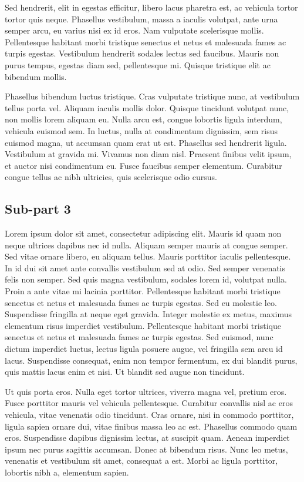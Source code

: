 \documentclass[a4paper,15pt]{article}
\begin{document}
Sed hendrerit, elit in egestas efficitur, libero lacus pharetra est, ac vehicula tortor tortor quis neque. Phasellus vestibulum, massa a iaculis volutpat, ante urna semper arcu, eu varius nisi ex id eros. Nam vulputate scelerisque mollis. Pellentesque habitant morbi tristique senectus et netus et malesuada fames ac turpis egestas. Vestibulum hendrerit sodales lectus sed faucibus. Mauris non purus tempus, egestas diam sed, pellentesque mi. Quisque tristique elit ac bibendum mollis.

Phasellus bibendum luctus tristique. Cras vulputate tristique nunc, at vestibulum tellus porta vel. Aliquam iaculis mollis dolor. Quisque tincidunt volutpat nunc, non mollis lorem aliquam eu. Nulla arcu est, congue lobortis ligula interdum, vehicula euismod sem. In luctus, nulla at condimentum dignissim, sem risus euismod magna, ut accumsan quam erat ut est. Phasellus sed hendrerit ligula. Vestibulum at gravida mi. Vivamus non diam nisl. Praesent finibus velit ipsum, et auctor nisi condimentum eu. Fusce faucibus semper elementum. Curabitur congue tellus ac nibh ultricies, quis scelerisque odio cursus.

\newpage

\subsection{Sub-part 3}

Lorem ipsum dolor sit amet, consectetur adipiscing elit. Mauris id quam non neque ultrices dapibus nec id nulla. Aliquam semper mauris at congue semper. Sed vitae ornare libero, eu aliquam tellus. Mauris porttitor iaculis pellentesque. In id dui sit amet ante convallis vestibulum sed at odio. Sed semper venenatis felis non semper. Sed quis magna vestibulum, sodales lorem id, volutpat nulla. Proin a ante vitae mi lacinia porttitor. Pellentesque habitant morbi tristique senectus et netus et malesuada fames ac turpis egestas. Sed eu molestie leo. Suspendisse fringilla at neque eget gravida. Integer molestie ex metus, maximus elementum risus imperdiet vestibulum. Pellentesque habitant morbi tristique senectus et netus et malesuada fames ac turpis egestas. Sed euismod, nunc dictum imperdiet luctus, lectus ligula posuere augue, vel fringilla sem arcu id lacus. Suspendisse consequat, enim non tempor fermentum, ex dui blandit purus, quis mattis lacus enim et nisi. Ut blandit sed augue non tincidunt.

Ut quis porta eros. Nulla eget tortor ultrices, viverra magna vel, pretium eros. Fusce porttitor mauris vel vehicula pellentesque. Curabitur convallis nisl ac eros vehicula, vitae venenatis odio tincidunt. Cras ornare, nisi in commodo porttitor, ligula sapien ornare dui, vitae finibus massa leo ac est. Phasellus commodo quam eros. Suspendisse dapibus dignissim lectus, at suscipit quam. Aenean imperdiet ipsum nec purus sagittis accumsan. Donec at bibendum risus. Nunc leo metus, venenatis et vestibulum sit amet, consequat a est. Morbi ac ligula porttitor, lobortis nibh a, elementum sapien.
\end{document}
